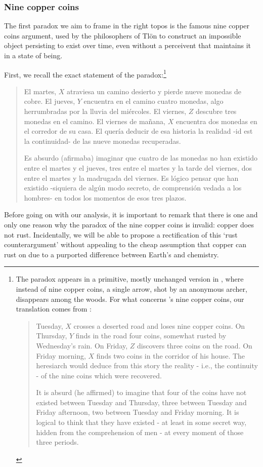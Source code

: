 \subsubsection{Nine copper coins} The first paradox we aim to frame in the right topos is the famous nine copper coins argument, used by the philosophers of Tlön to construct an impossible object persisting to exist over time, even without a perceivent that maintains it in a state of being.
\begin{example}\label{bla}
  First, we recall the exact statement of the paradox:\footnote{The paradox appears in a primitive, mostly unchanged version in \cite{borges1997otras}, where instead of nine copper coins, a single arrow, shot by an anonymous archer, disappears among the woods. For what concerns \tlon's  nine copper coins, our translation comes from \cite{tlonEN}:
    \begin{quote}
      \hspace{.5em} Tuesday, $X$ crosses a deserted road and loses nine copper coins. On Thursday, $Y$ finds in the road four coins, somewhat rusted by Wednesday's rain. On Friday, $Z$ discovers three coins on the road. On Friday morning, $X$ finds two coins in the corridor of his house. The heresiarch would deduce from this story the reality - i.e., the continuity - of the nine coins which were recovered.

      \hspace{.5em} It is absurd (he affirmed) to imagine that four of the coins have not existed between Tuesday and Thursday, three between Tuesday and Friday afternoon, two between Tuesday and Friday morning. It is logical to think that they have existed - at least in some secret way, hidden from the comprehension of men - at every moment of those three periods.
    \end{quote}}
  \begin{quote}
    El martes, $X$ atraviesa un camino desierto y pierde nueve monedas de cobre.
    El jueves, $Y$ encuentra en el camino cuatro monedas, algo herrumbradas por la lluvia del miércoles. El viernes, $Z$ descubre tres monedas en el camino. El viernes de mañana, $X$ encuentra dos monedas en el corredor de su casa. El  quería deducir de esa historia la realidad -id est la continuidad- de las nueve monedas recuperadas.

    Es absurdo (afirmaba) imaginar que cuatro de las monedas no han existido entre el martes y el jueves, tres entre el martes y la tarde del viernes, dos entre el martes y la madrugada del viernes. Es lógico pensar que han existido -siquiera de algún modo secreto, de comprensión vedada a los hombres- en todos los momentos de esos tres plazos.
  \end{quote}
  Before going on with our analysis, it is important to remark that there is one and only one reason why the paradox of the nine copper coins is invalid: copper does not rust. Incidentally, we will be able to propose a rectification of this `rust counterargument' without appealing to the cheap assumption that copper can rust on \tlon due to a purported difference between Earth's and \tlonian chemistry.


\end{example}
